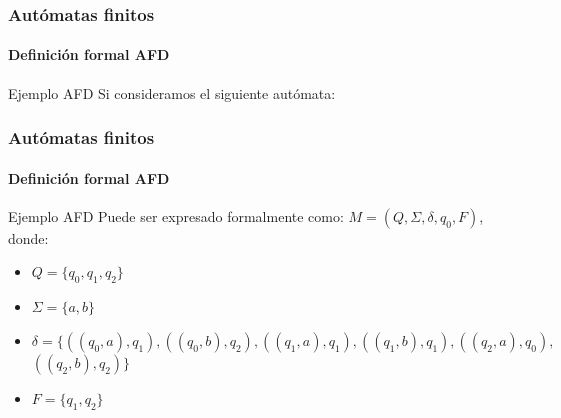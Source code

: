 \documentclass{beamer}
\begin{document}
        \begin{frame}
			\frametitle{Aut\'omatas finitos}
			\framesubtitle{Definici\'on formal AFD}

            \begin{exampleblock}{Ejemplo AFD}
               Si consideramos el siguiente aut\'omata:
               \begin{center}
			   \end{center}
            \end{exampleblock}
		\end{frame}
		
        \begin{frame}
			\frametitle{Aut\'omatas finitos}
			\framesubtitle{Definici\'on formal AFD}

            \begin{exampleblock}{Ejemplo AFD}
               Puede ser expresado formalmente como: $M = (Q, \Sigma, \delta, q_{0}, F)$, donde:
               \begin{itemize}
                   \item[] $Q = \{q_{0},q_{1},q_{2}\}$
                   \item[] $\Sigma = \{a,b\}$
                   \item[] $\delta =  \{((q_{0}, a), q_{1}), ((q_{0}, b), q_{2}), ((q_{1}, a), q_{1}), ((q_{1}, b), q_{1}), ((q_{2}, a), q_{0}),$ $ ((q_{2}, b), q_{2})\}$
                   \item[] $F = \{q_{1},q_{2}\}$
               \end{itemize}
            \end{exampleblock}
		\end{frame}
\end{document}
